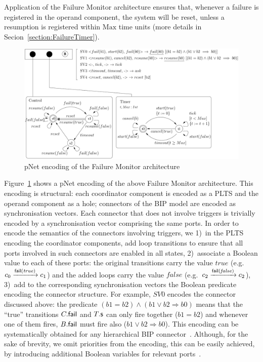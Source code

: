 \documentclass[smallcondensed]{svjour3}
\newcommand{\noteEM}[2][color=blue!40, size=\tiny]{\todo[#1]{{\bf Eric: } {#2}}}
\newcommand{\eg}[1][\ ]{e.g.#1}
\newcommand{\goesto}[2][]{\ensuremath{\xrightarrow[#1]{#2}}}
\newcommand{\true}{\ensuremath{\mathit{true}}}
\newcommand{\false}{\ensuremath{\mathit{false}}}
\begin{document}
Application of the Failure Monitor architecture ensures that, whenever
a failure is registered in the operand component, the system will be
reset, unless a resumption is registered within $\mathrm{Max}$ time
units (more details in Secion~\ref{section:FailureTimer}).

\begin{figure}[t]
  \centering
  \includegraphics[width=0.9\columnwidth]{ActaXFIG/FailureTimerPNET-v2-2}
  \caption{pNet encoding of the Failure Monitor architecture}
  \label{schema:ArchFailure:pNet}
\end{figure}

Figure~\ref{schema:ArchFailure:pNet} shows a pNet encoding of the
above Failure Monitor architecture.  This encoding is structural: each
coordinator component is encoded as a PLTS and the operand
component as a hole; connectors of the BIP model are encoded as
synchronisation vectors.  Each connector that does not involve
triggers is trivially encoded by a synchronisation vector comprising
the same ports.  In order to encode the semantics of the connectors
involving triggers, we 1)~in the PLTS encoding the coordinator
components, add loop transitions to ensure that all ports involved in
such connectors are enabled in all states, 2)~associate a Boolean
value to each of these ports: the original transitions carry the value
$\true$ (\eg $c_0 \goesto{\PortFail(\true)} c_1$) and the
added loops carry the value $\false$ (\eg $c_2
\goesto{\PortFail(\false)} c_2$), 3)~add to the corresponding
synchronisation vectors the Boolean predicate encoding the connector
structure.  For example, $SV0$ encodes the connector discussed above:
the predicate $(b1=b2) \land (b1\lor b2 \Rightarrow b0)$ means that the
``true'' transitions $C.\mathsf{fail}$ and $T.\mathsf{s}$
can only fire together ($b1 = b2$) and whenever one of them fires,
$B.\mathsf{fail}$ must fire also ($b1 \lor b2 \Rightarrow b0$).
This encoding can be systematically obtained for any hierarchical BIP
connector~\cite{BliSif10-causal-fmsd}.
%
\noteEM{Decide later if this is still useful}Although, for the sake of brevity, we omit priorities from the
encoding, this can be easily achieved, by introducing additional
Boolean variables for relevant ports~\cite{BarBliu15-offer-scico}.
\end{document}
